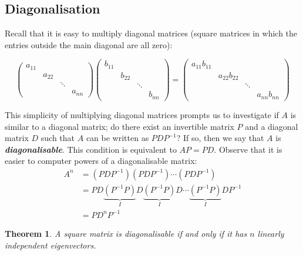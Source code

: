 \documentclass[a4paper]{article}
\theoremstyle{plain}
\newtheorem{theorem}{Theorem}[section]
\theoremstyle{definition}
\begin{document}
\subsection{Diagonalisation}

Recall that it is easy to multiply diagonal matrices (square matrices in which the entries outside the main diagonal
are all zero):

\[
	\begin{pmatrix}
		a_{11} &        &        &        \\
		       & a_{22} &        &        \\
		       &        & \ddots &        \\
		       &        &        & a_{nn}
	\end{pmatrix}
	\begin{pmatrix}
		b_{11} &        &        &        \\
		       & b_{22} &        &        \\
		       &        & \ddots &        \\
		       &        &        & b_{nn}
	\end{pmatrix}
	=
	\begin{pmatrix}
		a_{11}b_{11} &              &        &              \\
		             & a_{22}b_{22} &        &              \\
		             &              & \ddots &              \\
		             &              &        & a_{nn}b_{nn}
	\end{pmatrix}
\]

This simplicity of multiplying diagonal matrices prompts us to investigate if $A$ is similar to a diagonal matrix; do
there exist an invertible matrix $P$ and a diagonal matrix $D$ such that $A$ can be written as $PDP^{-1}$? If so, then
we say that $A$ is \textbf{\textit{diagonalisable}}. This condition is equivalent to $AP=PD$. Observe that it is easier
to computer powers of a diagonalisable matrix:
\begin{align*}
	A^n & = (PDP^{-1})(PDP^{-1})\cdots(PDP^{-1})                                                             \\
	    & = PD\underbrace{(P^{-1}P)}_{I}D\underbrace{(P^{-1}P)}_{I}D\cdots \underbrace{(P^{-1}P)}_{I}DP^{-1} \\
	    & = PD^n P^{-1}
\end{align*}

\begin{theorem}
	\label{thrm:1}
	A square matrix is diagonalisable if and only if it has $n$ linearly independent eigenvectors.
\end{theorem}
\end{document}
